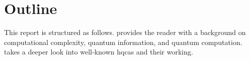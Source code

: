 

\section{Outline}
This report is structured as follows.  provides the reader with a background on computational complexity, quantum information, and quantum computation.  takes a deeper look into well-known \glspl{hqca} and their working.
